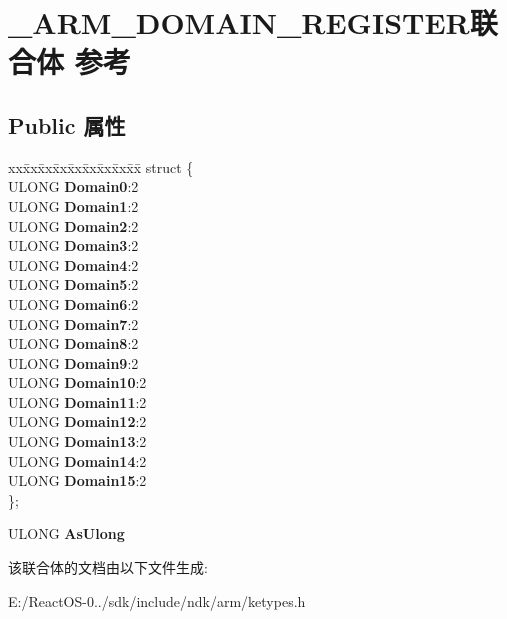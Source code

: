 \hypertarget{union___a_r_m___d_o_m_a_i_n___r_e_g_i_s_t_e_r}{}\section{\+\_\+\+A\+R\+M\+\_\+\+D\+O\+M\+A\+I\+N\+\_\+\+R\+E\+G\+I\+S\+T\+E\+R联合体 参考}
\label{union___a_r_m___d_o_m_a_i_n___r_e_g_i_s_t_e_r}
\subsection*{Public 属性}
\begin{DoxyCompactItemize}
\item 
\mbox{\label{union___a_r_m___d_o_m_a_i_n___r_e_g_i_s_t_e_r_af3379eebd2a5f250cf4fbeba06aa7f84}} 
\begin{tabbing}
xx\=xx\=xx\=xx\=xx\=xx\=xx\=xx\=xx\=\kill
struct \{\\
\>ULONG {\bfseries Domain0}:2\\
\>ULONG {\bfseries Domain1}:2\\
\>ULONG {\bfseries Domain2}:2\\
\>ULONG {\bfseries Domain3}:2\\
\>ULONG {\bfseries Domain4}:2\\
\>ULONG {\bfseries Domain5}:2\\
\>ULONG {\bfseries Domain6}:2\\
\>ULONG {\bfseries Domain7}:2\\
\>ULONG {\bfseries Domain8}:2\\
\>ULONG {\bfseries Domain9}:2\\
\>ULONG {\bfseries Domain10}:2\\
\>ULONG {\bfseries Domain11}:2\\
\>ULONG {\bfseries Domain12}:2\\
\>ULONG {\bfseries Domain13}:2\\
\>ULONG {\bfseries Domain14}:2\\
\>ULONG {\bfseries Domain15}:2\\
\}; \\

\end{tabbing}\item 
\mbox{\label{union___a_r_m___d_o_m_a_i_n___r_e_g_i_s_t_e_r_abb4c129f8442d663bd852616fb9503f4}} 
U\+L\+O\+NG {\bfseries As\+Ulong}
\end{DoxyCompactItemize}


该联合体的文档由以下文件生成\+:\begin{DoxyCompactItemize}
\item 
E\+:/\+React\+O\+S-\/0../sdk/include/ndk/arm/ketypes.\+h\end{DoxyCompactItemize}
